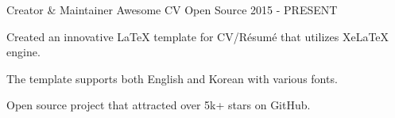 

\begin{cventries}

\cventry
{Creator \& Maintainer} %
{Awesome CV} %
{Open Source} %
{2015 - PRESENT} %
{
  \begin{cvitems} %
    \item {Created an innovative LaTeX template for CV/Résumé that utilizes XeLaTeX engine.}
    \item {The template supports both English and Korean with various fonts.}
    \item {Open source project that attracted over 5k+ stars on GitHub.}
  \end{cvitems}
}

\end{cventries}
